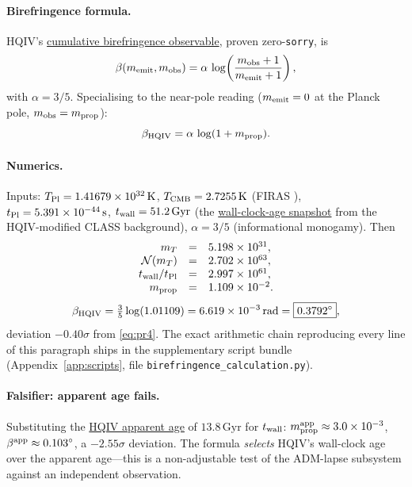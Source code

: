 \documentclass[11pt]{amsart}
\begin{document}
\paragraph{Birefringence formula.}  HQIV's
\hyperref[lean:cumbire]{cumulative birefringence observable},
proven zero-\texttt{sorry}, is
\begin{equation}\label{eq:cumbire}
  \beta(m_{\rm emit},m_{\rm obs})
   =\alpha\,\log\!\left(\frac{m_{\rm obs}+1}{m_{\rm emit}+1}\right),
\end{equation}
with $\alpha=3/5$.  Specialising to the near-pole reading
($m_{\rm emit}=0$ at the Planck pole, $m_{\rm obs}=m_{\rm prop}$):
\begin{equation}\label{eq:cumbireNP}
  \beta_{\rm HQIV}=\alpha\,\log(1+m_{\rm prop}).
\end{equation}

\paragraph{Numerics.}  Inputs:
$T_{\rm Pl}=1.41679\times10^{32}\,\mathrm{K}$,
$T_{\rm CMB}=2.7255\,\mathrm{K}$ (FIRAS \cite{fixsen2009}),
$t_{\rm Pl}=5.391\times10^{-44}\,\mathrm{s}$,
$t_{\rm wall}=51.2\,\mathrm{Gyr}$ (the
\hyperref[lean:wall-clock]{wall-clock-age snapshot} from the
HQIV-modified CLASS background),
$\alpha=3/5$ (informational monogamy).  Then
\[
\begin{array}{rcl}
  m_T &=& 5.198\times10^{31},\\
  \mathcal{N}(m_T) &=& 2.702\times10^{63},\\
  t_{\rm wall}/t_{\rm Pl} &=& 2.997\times10^{61},\\
  m_{\rm prop} &=& 1.109\times10^{-2}.
\end{array}
\]
\begin{equation}\label{eq:final}
  \beta_{\rm HQIV}
   =\tfrac{3}{5}\log(1.01109)
   =6.619\times10^{-3}\,\mathrm{rad}
   =\boxed{0.3792^\circ},
\end{equation}
deviation $-0.40\sigma$ from \eqref{eq:pr4}. The exact arithmetic
chain reproducing every line of this paragraph ships in the
supplementary script bundle (Appendix~\ref{app:scripts}, file
\texttt{birefringence\_calculation.py}).

\paragraph{Falsifier: apparent age fails.}  Substituting the
\hyperref[lean:apparent-age]{HQIV apparent age} of
$13.8\,\mathrm{Gyr}$ for $t_{\rm wall}$:
$m_{\rm prop}^{\rm app}\approx 3.0\times10^{-3}$,
$\beta^{\rm app}\approx 0.103^\circ$, a $-2.55\sigma$ deviation.
The formula \emph{selects} HQIV's wall-clock age over the apparent
age---this is a non-adjustable test of the ADM-lapse subsystem
against an independent observation.
\end{document}
